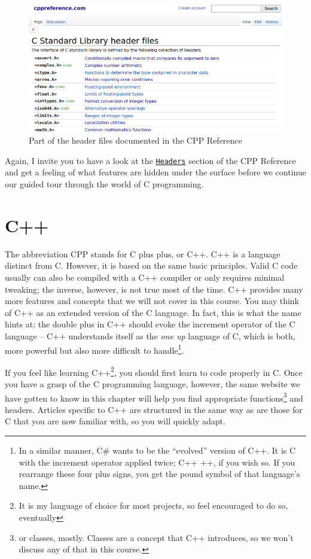 \begin{figure}
	\includegraphics[width=\linewidth]{./gfx/cpp-headers}
	\caption{Part of the header files documented in the CPP Reference} \label{fig:cpp-headers}
\end{figure}

Again, I invite you to have a look at the \href{https://en.cppreference.com/w/c/header}{\texttt{Headers}} section of the CPP Reference and get a feeling of what features are hidden under the surface before we continue our guided tour through the world of C programming.


\section{C++}
The abbreviation CPP stands for C plus plus, or C++. C++ is a language distinct from C. However, it is based on the same basic principles. Valid C code usually can also be compiled with a C++ compiler or only requires minimal tweaking; the inverse, however, is not true most of the time. C++ provides many more features and concepts that we will not cover in this course. You may think of C++ as an extended version of the C language. In fact, this is what the name hints at: the double plus in C++ should evoke the increment operator of the C language -- C++ understands itself as the \emph{one up} language of C, which is both, more powerful but also more difficult to handle\footnote{In a similar manner, C\# wants to be the \enquote{evolved} version of C++. It is C with the increment operator applied twice; C++ ++, if you wish so. If you rearrange these four plus signs, you get the pound symbol of that language's name.}.

If you feel like learning C++\footnote{It is my language of choice for most projects, so feel encouraged to do so, eventually}, you should first learn to code properly in C. Once you have a grasp of the C programming language, however, the same website we have gotten to know in this chapter will help you find appropriate functions\footnote{or classes, mostly. Classes are a concept that C++ introduces, so we won't discuss any of that in this course.} and headers. Articles specific to C++ are structured in the same way as are those for C that you are now familiar with, so you will quickly adapt.

